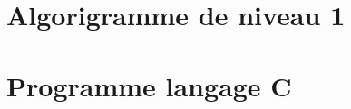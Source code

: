 \documentclass[12pt,oneside,a4paper]{book}
\begin{document}
\appendix

\chapter{Algorigramme de niveau 1}
	\thispagestyle{fancy}


\chapter{Programme langage C}
\thispagestyle{programme}
\pagestyle{programme}
\end{document}
